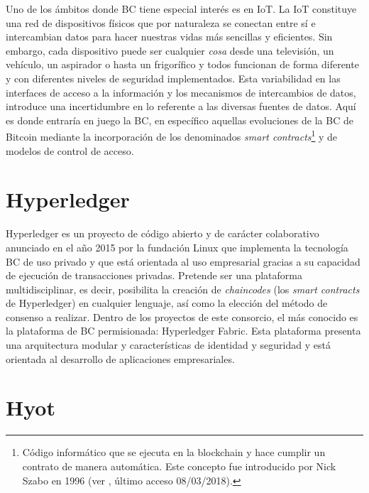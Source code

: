 \documentclass[10pt,conference,a4paper]{IEEEtran}
\begin{document}
Uno de los ámbitos donde BC tiene especial interés es en IoT. La IoT
constituye una red de dispositivos físicos que por naturaleza se
conectan entre sí e intercambian datos para hacer nuestras vidas más
sencillas y eficientes. Sin embargo, cada dispositivo puede ser
cualquier \textit{cosa} desde una televisión, un vehículo, un
aspirador o hasta un frigorífico y todos funcionan de forma diferente
y con diferentes niveles de seguridad implementados. Esta variabilidad
en las interfaces de acceso a la información y los mecanismos de
intercambios de datos, introduce una incertidumbre en lo referente a
las diversas fuentes de datos. Aquí es donde entraría en juego la BC,
en específico aquellas evoluciones de la BC de Bitcoin mediante la
incorporación de los denominados \emph{smart
  contracts}\footnote{Código informático que se ejecuta en la
  blockchain y hace cumplir un contrato de manera automática. Este
  concepto fue introducido por Nick Szabo en 1996 (ver \cite{JNIC2018_6},
  último acceso 08/03/2018).} y
de modelos de control de acceso.

\section{Hyperledger}

Hyperledger es un proyecto de código abierto y de carácter
colaborativo anunciado en el año 2015 por la fundación Linux que
implementa la tecnología BC de uso privado y que está orientada al uso
empresarial gracias a su capacidad de ejecución de transacciones
privadas. Pretende ser una plataforma multidisciplinar, es decir,
posibilita la creación de \textit{chaincodes} (los \textit{smart
  contracts} de Hyperledger) en cualquier lenguaje, así como la
elección del método de consenso a realizar. Dentro de los proyectos de
este consorcio, el más conocido es la plataforma de BC permisionada:
Hyperledger Fabric. Esta plataforma presenta una arquitectura modular
y características de identidad y seguridad y está orientada al
desarrollo de aplicaciones empresariales.

\section{Hyot}
\end{document}
